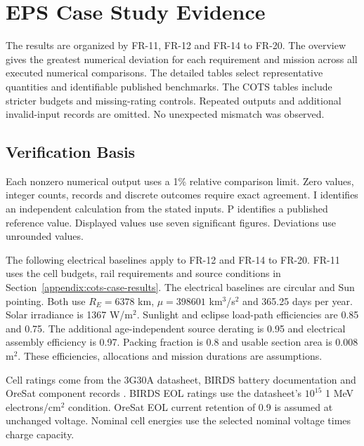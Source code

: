\chapter{EPS Case Study Evidence}\label{appendix:eps-case-studies}

The results are organized by FR-11, FR-12 and FR-14 to FR-20.
The overview gives the greatest numerical deviation for each requirement and mission across all executed numerical comparisons.
The detailed tables select representative quantities and identifiable published benchmarks.
The COTS tables include stricter budgets and missing-rating controls.
Repeated outputs and additional invalid-input records are omitted.
No unexpected mismatch was observed.

\section{Verification Basis}
\label{appendix:eps-case-basis}
Each nonzero numerical output uses a 1\% relative comparison limit.
Zero values, integer counts, records and discrete outcomes require exact agreement.
I identifies an independent calculation from the stated inputs.
P identifies a published reference value.
Displayed values use seven significant figures. Deviations use unrounded values.

The following electrical baselines apply to FR-12 and FR-14 to FR-20.
FR-11 uses the cell budgets, rail requirements and source conditions in Section~\ref{appendix:cots-case-results}.
The electrical baselines are circular and Sun pointing.
Both use $R_E=6378$ km, $\mu=398601$ km$^3$/s$^2$ and 365.25 days per year.
Solar irradiance is 1367 W/m$^2$.
Sunlight and eclipse load-path efficiencies are 0.85 and 0.75.
The additional age-independent source derating is 0.95 and electrical assembly efficiency is 0.97.
Packing fraction is 0.8 and usable section area is 0.008 m$^2$.
These efficiencies, allocations and mission durations are assumptions.

Cell ratings come from the 3G30A datasheet, BIRDS battery documentation and OreSat component records \citep{cots-mission_azur_space_3g30a_review_legacy_ds,birds2021batteryverification,greenberg2021oresat,oresat2025solardesign,cots-mission_tenergy_30005_0_ds}.
BIRDS EOL ratings use the datasheet's $10^{15}$ 1 MeV electrons/cm$^2$ condition.
OreSat EOL current retention of 0.9 is assumed at unchanged voltage.
Nominal cell energies use the selected nominal voltage times charge capacity.


